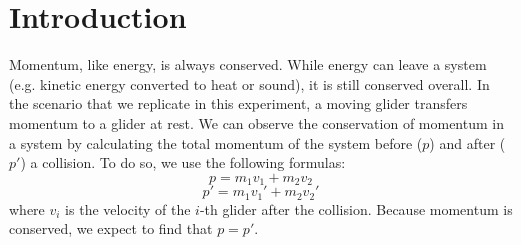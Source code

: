 \section*{Introduction}

\noindent
Momentum, like energy, is always conserved. While energy can leave a system (e.g. kinetic energy converted to
heat or sound), it is still conserved overall. In the scenario that we replicate in this experiment, a moving glider 
transfers momentum to a glider at rest. We can observe the conservation of momentum in a system by calculating 
the total momentum of the system before ($p$) and after ($p'$) a collision. To do so, we use the following formulas:
\[ p = m_{1}v_{1} + m_{2}v_{2} \]
\[ p' = m_{1}v_{1}' + m_{2}v_{2}' \]
where $v_i$ is the velocity of the $i$-th glider after the collision. Because momentum is conserved, we expect to 
find that $p=p'$.
